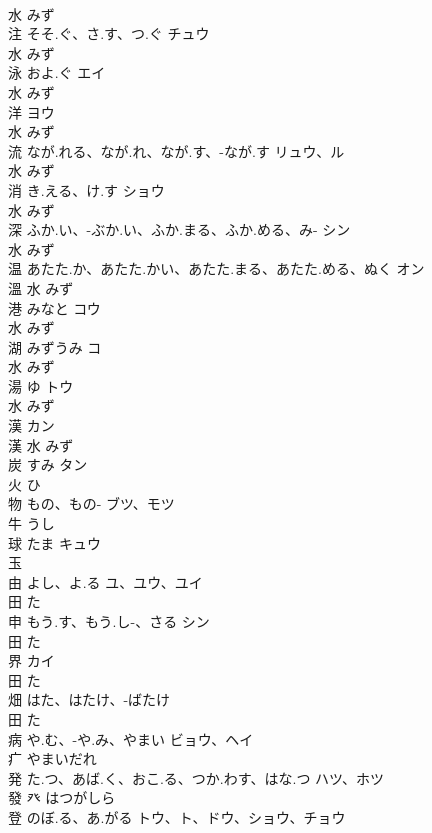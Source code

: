 \documentclass[8pt]{extreport}
\begin{document}
\begin{CJK}{UTF8}{min}
\\	水		みず		
\\	注	そそ.ぐ、さ.す、つ.ぐ	チュウ	
\\	水		みず		
\\	泳	およ.ぐ	エイ	
\\	水		みず		
\\	洋		ヨウ	
\\	水		みず		
\\	流	なが.れる、なが.れ、なが.す、-なが.す	リュウ、ル	
\\	水		みず		
\\	消	き.える、け.す	ショウ	
\\	水		みず		
\\	深	ふか.い、-ぶか.い、ふか.まる、ふか.める、み-	シン	
\\	水		みず		
\\	温	あたた.か、あたた.かい、あたた.まる、あたた.める、ぬく	オン	
\\	溫	水		みず		
\\	港	みなと	コウ	
\\	水		みず		
\\	湖	みずうみ	コ	
\\	水		みず		
\\	湯	ゆ	トウ	
\\	水		みず		
\\	漢		カン	
\\	漢	水		みず		
\\	炭	すみ	タン	
\\	火		ひ		
\\	物	もの、もの-	ブツ、モツ	
\\	牛		うし		
\\	球	たま	キュウ	
\\	玉				
\\	由	よし、よ.る	ユ、ユウ、ユイ	
\\	田		た		
\\	申	もう.す、もう.し-、さる	シン	
\\	田		た		
\\	界		カイ	
\\	田		た		
\\	畑	はた、はたけ、-ばたけ		
\\	田		た		
\\	病	や.む、-や.み、やまい	ビョウ、ヘイ	
\\	疒		やまいだれ		
\\	発	た.つ、あば.く、おこ.る、つか.わす、はな.つ	ハツ、ホツ	
\\	發	癶		はつがしら		
\\	登	のぼ.る、あ.がる	トウ、ト、ドウ、ショウ、チョウ	

\end{CJK}
\end{document}

